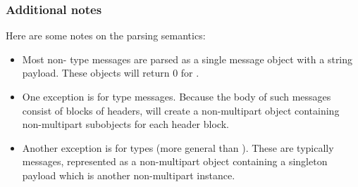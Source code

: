 \subsubsection{Additional notes}

Here are some notes on the parsing semantics:

\begin{itemize}
\item Most non- type messages are parsed as a single
      message object with a string payload.  These objects will return
      0 for .
\item One exception is for  type
      messages.  Because the body of such messages consist of
      blocks of headers,  will create a non-multipart
      object containing non-multipart subobjects for each header
      block.
\item Another exception is for  types (more
      general than ).  These are
      typically  messages, represented as a
      non-multipart object containing a singleton payload which is
      another non-multipart  instance.
\end{itemize}

